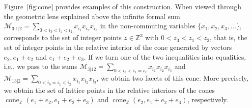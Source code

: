\documentclass[12pt,reqno]{amsart}
\numberwithin{definition}{section}
\theoremstyle{definition}
\newcommand{\ZZ}{\mathbb{Z}}
\newcommand{\cone}{\operatorname{cone}}
\newcommand{\ncM}{\mathcal{M}}
\begin{document}
Figure~\ref{fig:cone} provides examples of this construction.  When viewed
through the geometric lens explained above the infinite formal sum
$\ncM_{3|1|2} = \sum_{0<i_3<i_1<i_2} x_{i_1}x_{i_2}x_{i_3}$ in the non-commuting
variables $\{x_1,x_2,x_3,\ldots\}$, corresponds to the set of integer
points $z\in\ZZ^3$ with $0<z_3<z_1<z_2$, that is, the set of integer
points in the relative interior of the cone generated by vectors
$e_2,e_1+e_2$ and $e_1+e_2+e_3$. If we turn one of the two
inequalities into equalities, i.e., we pass to the sums
$\ncM_{3|12} = \sum_{0<i_3<i_1 = i_2} x_{i_1}x_{i_2}x_{i_3}$ and
$\ncM_{13|2} = \sum_{0<i_3=i_1<i_2} x_{i_1}x_{i_2}x_{i_3}$, we obtain two facets of
this cone. More precisely, we obtain the set of lattice points in the
relative interiors of the cones $\cone_\ZZ(e_1+e_2,e_1+e_2+e_3)$ and
$\cone_\ZZ(e_2,e_1+e_2+e_3)$, respectively.
\end{document}
